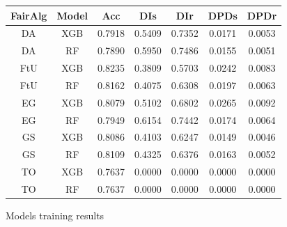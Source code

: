 \begin{figure}[H]
    \centering
    \begin{tabular}{|c|c|c|c|c|c|c|}
        \hline
        \textbf{FairAlg} & \textbf{Model} & \textbf{Acc} & \textbf{DIs} & \textbf{DIr} & \textbf{DPDs} & \textbf{DPDr} \\
        \hline
        DA & XGB & 0.7918 & 0.5409 & 0.7352 & 0.0171 & 0.0053 \\
        DA & RF & 0.7890 & 0.5950 & 0.7486 & 0.0155 & 0.0051 \\
        FtU & XGB & 0.8235 & 0.3809 & 0.5703 & 0.0242 & 0.0083 \\
        FtU & RF & 0.8162 & 0.4075 & 0.6308 & 0.0197 & 0.0063 \\
        EG & XGB & 0.8079 & 0.5102 & 0.6802 & 0.0265 & 0.0092 \\
        EG & RF & 0.7949 & 0.6154 & 0.7442 & 0.0174 & 0.0064 \\
        GS & XGB & 0.8086 & 0.4103 & 0.6247 & 0.0149 & 0.0046 \\
        GS & RF & 0.8109 & 0.4325 & 0.6376 & 0.0163 & 0.0052 \\
        TO & XGB & 0.7637 & 0.0000 & 0.0000 & 0.0000 & 0.0000 \\
        TO & RF & 0.7637 & 0.0000 & 0.0000 & 0.0000 & 0.0000 \\
        \hline
    \end{tabular}
    \caption{Models training results}
    \label{fig:results}
\end{figure}

